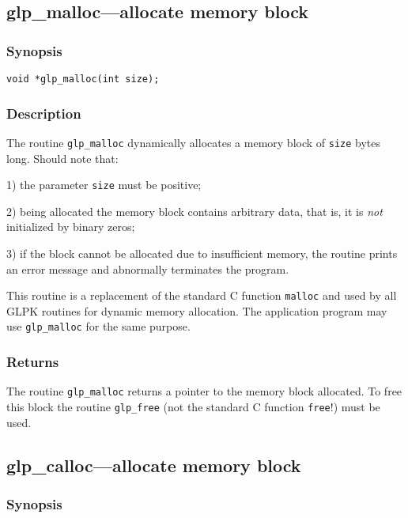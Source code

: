 \subsection{glp\_malloc---allocate memory block}

\subsubsection*{Synopsis}

\begin{verbatim}
void *glp_malloc(int size);
\end{verbatim}

\subsubsection*{Description}

The routine \verb|glp_malloc| dynamically allocates a memory block of
\verb|size| bytes long. Should note that:

1) the parameter \verb|size| must be positive;

2) being allocated the memory block contains arbitrary data, that is,
it is {\it not} initialized by binary zeros;

3) if the block cannot be allocated due to insufficient memory, the
routine prints an error message and abnormally terminates the program.

This routine is a replacement of the standard C function \verb|malloc|
and used by all GLPK routines for dynamic memory allocation. The
application program may use \verb|glp_malloc| for the same purpose.

\subsubsection*{Returns}

The routine \verb|glp_malloc| returns a pointer to the memory block
allocated. To free this block the routine \verb|glp_free| (not the
standard C function \verb|free|!) must be used.

\subsection{glp\_calloc---allocate memory block}

\subsubsection*{Synopsis}

